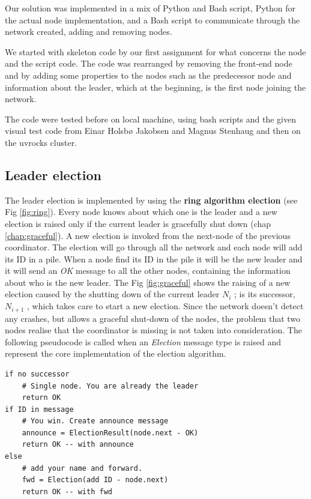 \documentclass[11pt,conference]{IEEEtran}
\begin{document}
Our solution was implemented in a mix of Python and Bash script, Python for the
actual node implementation, and a Bash script to communicate through the network created, adding and removing nodes.

We started with skeleton code by our first assignment for what concerns the node and the script code. 
The code was rearranged by removing the front-end node and by adding some properties to the nodes such as the predecessor node and information about the leader, which at the beginning, is the first node joining the network.

The code were tested before on local machine, using bash scripts and the given visual test code from Einar Holsbø Jakobsen and Magnus Stenhaug and then on the uvrocks cluster.

\subsection{Leader election}
The leader election is implemented by using the \textbf{ring algorithm election} (see Fig \ref{fig:ring}). Every node knows about which one is the leader and a new election is raised only if the current leader is gracefully shut down (chap \ref{chap:graceful}). A new election is invoked from the next-node of the previous coordinator. The election will go through all the network and each node will add its ID in a pile. When a node find its ID in the pile it will be the new leader and it will send an \textit{OK} message to all the other nodes, containing the information about who is the new leader. The Fig \ref{fig:graceful} shows the raising of a new election caused by the shutting down of the current leader $N_i$ ; is its successor, $N_{i+1}$ , which takes care to start a new election.
\newline
Since the network doesn't detect any crashes, but allows a graceful shut-down of the nodes, the problem that two nodes realise that the coordinator is missing is not taken into consideration.
\newline
The following pseudocode is called when an \textit{Election} message type is raised and represent the core implementation of the election algorithm.
\begin{lstlisting}
if no successor
    # Single node. You are already the leader
    return OK
if ID in message
    # You win. Create announce message
    announce = ElectionResult(node.next - OK)
    return OK -- with announce
else
    # add your name and forward.
    fwd = Election(add ID - node.next)
    return OK -- with fwd
\end{lstlisting}
\end{document}
